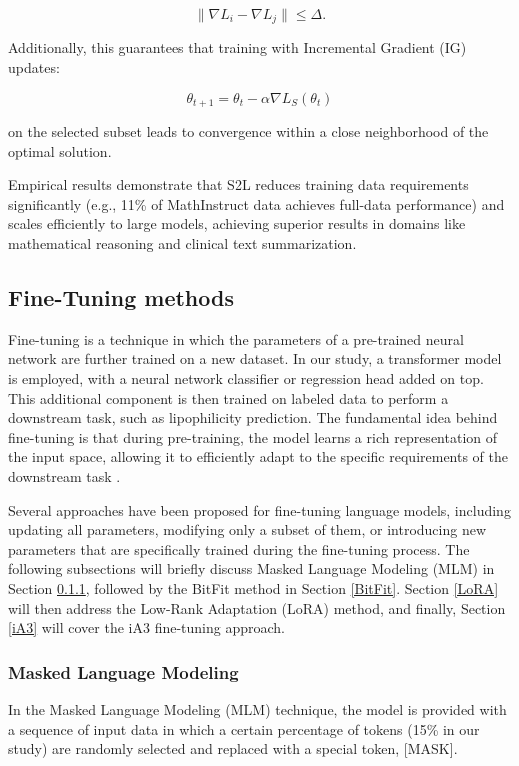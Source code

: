 \documentclass[11pt]{article}
\begin{document}
\begin{equation}
    \| \nabla L_i - \nabla L_j \| \leq \Delta.
\end{equation}

Additionally, this guarantees that training with Incremental Gradient (IG) updates:

\begin{equation}
    \theta_{t+1} = \theta_t - \alpha \nabla L_S(\theta_t)
\end{equation}

on the selected subset leads to convergence within a close neighborhood of the optimal solution. 

Empirical results demonstrate that S2L reduces training data requirements significantly (e.g., 11\% of MathInstruct data achieves full-data performance) and scales efficiently to large models, achieving superior results in domains like mathematical reasoning and clinical text summarization\cite{yang2023small}.




\subsection{Fine-Tuning methods}
\label{Fine-Tuning methods}
Fine-tuning is a technique in which the parameters of a pre-trained neural network are further trained on a new dataset. In our study, a transformer model is employed, with a neural network classifier or regression head added on top. This additional component is then trained on labeled data to perform a downstream task, such as lipophilicity prediction. The fundamental idea behind fine-tuning is that during pre-training, the model learns a rich representation of the input space, allowing it to efficiently adapt to the specific requirements of the downstream task \cite{jurafsky2023speech}.

Several approaches have been proposed for fine-tuning language models, including updating all parameters, modifying only a subset of them, or introducing new parameters that are specifically trained during the fine-tuning process. The following subsections will briefly discuss Masked Language Modeling (MLM) in Section \ref{MLM}, followed by the BitFit method in Section \ref{BitFit}. Section \ref{LoRA} will then address the Low-Rank Adaptation (LoRA) method, and finally, Section \ref{iA3} will cover the iA3 fine-tuning approach.
\subsubsection{Masked Language Modeling}
    \label{MLM}
In the Masked Language Modeling (MLM) technique, the model is provided with a sequence of input data in which a certain percentage of tokens (15\% in our study) are randomly selected and replaced with a special token, [MASK].
\end{document}
